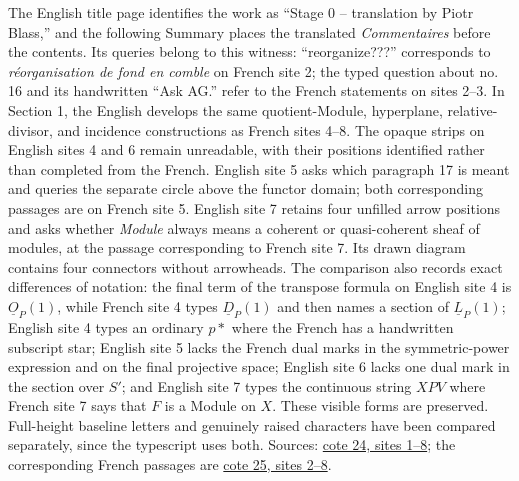 The English title page identifies the work as ``Stage 0 -- translation by Piotr Blass,'' and the following Summary places the translated \emph{Commentaires} before the contents. Its queries belong to this witness: ``reorganize???'' corresponds to \emph{réorganisation de fond en comble} on French site 2; the typed question about no.\,16 and its handwritten ``Ask AG.'' refer to the French statements on sites 2--3. In Section 1, the English develops the same quotient-Module, hyperplane, relative-divisor, and incidence constructions as French sites 4--8. The opaque strips on English sites 4 and 6 remain unreadable, with their positions identified rather than completed from the French. English site 5 asks which paragraph 17 is meant and queries the separate circle above the functor domain; both corresponding passages are on French site 5. English site 7 retains four unfilled arrow positions and asks whether \emph{Module} always means a coherent or quasi-coherent sheaf of modules, at the passage corresponding to French site 7. Its drawn diagram contains four connectors without arrowheads. The comparison also records exact differences of notation: the final term of the transpose formula on English site 4 is $\underline O_P(1)$, while French site 4 types $\underline D_P(1)$ and then names a section of $\underline L_P(1)$; English site 4 types an ordinary $p*$ where the French has a handwritten subscript star; English site 5 lacks the French dual marks in the symmetric-power expression and on the final projective space; English site 6 lacks one dual mark in the section over $S'$; and English site 7 types the continuous string $XPV$ where French site 7 says that $F$ is a Module on $X$. These visible forms are preserved. Full-height baseline letters and genuinely raised characters have been compared separately, since the typescript uses both. Sources: \href{https://grothendieck.umontpellier.fr/web/viewer.html?file=../24.pdf\#page=2}{cote 24, sites 1--8}; the corresponding French passages are \href{https://grothendieck.umontpellier.fr/web/viewer.html?file=../25.pdf\#page=3}{cote 25, sites 2--8}.

